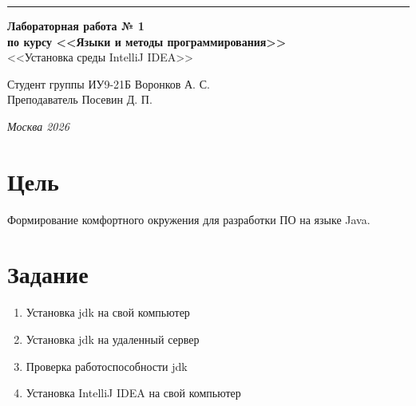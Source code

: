 \documentclass[a4paper, 14pt]{extarticle}
\begin{document}
\begin{titlepage}
\vspace*{-16pt}
\hspace{30pt}\rule{0.866\textwidth}{0.4pt}
  
\vspace{11em}

\begin{center}
\Large {\bf Лабораторная работа № 1} \\ 
\large {\bf по курсу <<Языки и методы программирования>>} \\ 
\large <<Установка среды IntelliJ IDEA>>
\end{center}\normalsize

\vspace{8em}


\begin{flushright}
  {Студент группы ИУ9-21Б Воронков А. С.\hspace*{15pt} \\
  \vspace{2ex}
  Преподаватель Посевин Д. П.\hspace*{15pt}}
\end{flushright}

\bigskip

\vfill
 

\begin{center}
\textsl{Москва 2026}
\end{center}
\end{titlepage}

\renewcommand{\ttdefault}{pcr}

\setlength{\tabcolsep}{3pt}
\newpage
\setcounter{page}{2}

\section{Цель}\label{Sect::task}
\par 
Формирование комфортного окружения для 
разработки ПО на языке Java.
\section{Задание}
\begin{enumerate}
    \item Установка jdk на свой компьютер 
    \item Установка jdk на удаленный сервер 
    \item Проверка работоспособности jdk 
    \item Установка IntelliJ IDEA на свой компьютер 
\end{enumerate}
\pagebreak
\end{document}
